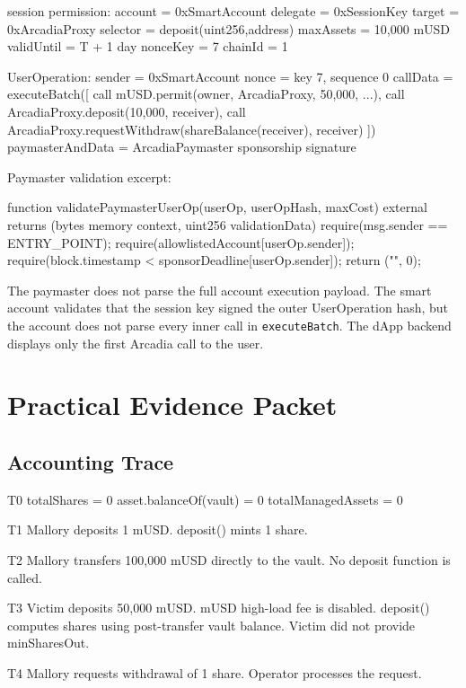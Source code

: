 \begin{codeblock}
session permission:
    account = 0xSmartAccount
    delegate = 0xSessionKey
    target = 0xArcadiaProxy
    selector = deposit(uint256,address)
    maxAssets = 10,000 mUSD
    validUntil = T + 1 day
    nonceKey = 7
    chainId = 1

UserOperation:
    sender = 0xSmartAccount
    nonce = key 7, sequence 0
    callData =
        executeBatch([
            call mUSD.permit(owner, ArcadiaProxy, 50,000, ...),
            call ArcadiaProxy.deposit(10,000, receiver),
            call ArcadiaProxy.requestWithdraw(shareBalance(receiver), receiver)
        ])
    paymasterAndData = ArcadiaPaymaster sponsorship signature
\end{codeblock}

Paymaster validation excerpt:

\begin{codeblock}
function validatePaymasterUserOp(userOp, userOpHash, maxCost)
    external
    returns (bytes memory context, uint256 validationData)
{
    require(msg.sender == ENTRY_POINT);
    require(allowlistedAccount[userOp.sender]);
    require(block.timestamp < sponsorDeadline[userOp.sender]);
    return ("", 0);
}
\end{codeblock}

The paymaster does not parse the full account execution payload. The smart account validates that the session key signed the outer UserOperation hash, but the account does not parse every inner call in \texttt{executeBatch}. The dApp backend displays only the first Arcadia call to the user.

\section*{Practical Evidence Packet}

\subsection*{Accounting Trace}

\begin{codeblock}
T0
    totalShares = 0
    asset.balanceOf(vault) = 0
    totalManagedAssets = 0

T1
    Mallory deposits 1 mUSD.
    deposit() mints 1 share.

T2
    Mallory transfers 100,000 mUSD directly to the vault.
    No deposit function is called.

T3
    Victim deposits 50,000 mUSD.
    mUSD high-load fee is disabled.
    deposit() computes shares using post-transfer vault balance.
    Victim did not provide minSharesOut.

T4
    Mallory requests withdrawal of 1 share.
    Operator processes the request.
\end{codeblock}

